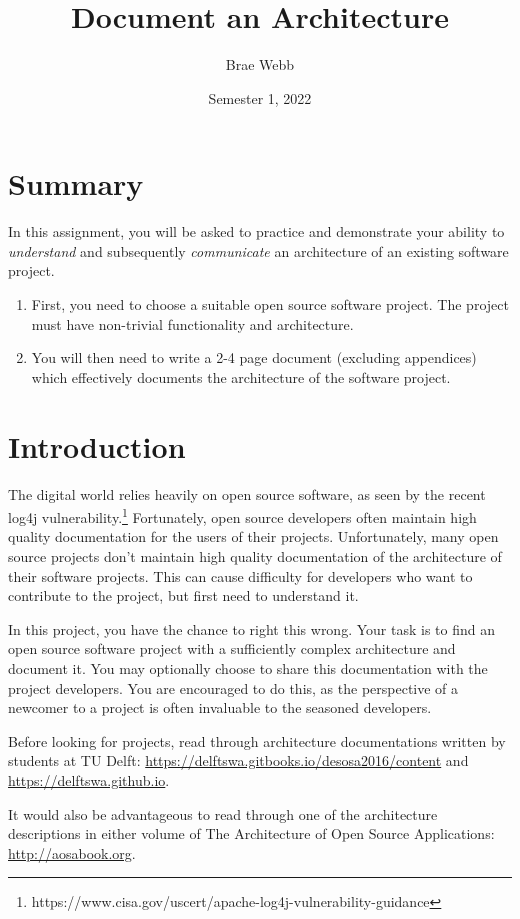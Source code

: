 \documentclass{csse4400}
\title{Document an Architecture}
\author{Brae Webb}
\date{Semester 1, 2022}
\begin{document}
\maketitle

\section*{Summary}
In this assignment, you will be asked to practice and demonstrate your ability to
\textsl{understand} and subsequently \textsl{communicate} an architecture of an existing software project.
\begin{enumerate}
\item First, you need to choose a suitable open source software project.
        The project must have non-trivial functionality and architecture.
\item You will then need to write a 2-4 page document (excluding appendices) which 
        effectively documents the architecture of the software project.
\end{enumerate}

\section{Introduction}
The digital world relies heavily on open source software, as seen by the recent log4j vulnerability.\footnote{https://www.cisa.gov/uscert/apache-log4j-vulnerability-guidance}
Fortunately, open source developers often maintain high quality documentation for the users of their projects.
Unfortunately, many open source projects don't maintain high quality documentation of the architecture of their software projects.
This can cause difficulty for developers who want to contribute to the project, but first need to understand it.

In this project, you have the chance to right this wrong.
Your task is to find an open source software project with a sufficiently complex architecture and document it.
You may optionally choose to share this documentation with the project developers.
You are encouraged to do this, as the perspective of a newcomer to a project is often invaluable to the seasoned developers.

Before looking for projects, read through architecture documentations written by students at TU Delft:
\url{https://delftswa.gitbooks.io/desosa2016/content} and \url{https://delftswa.github.io}.

It would also be advantageous to read through one of the architecture descriptions in either volume of
The Architecture of Open Source Applications: \url{http://aosabook.org}.
\end{document}
